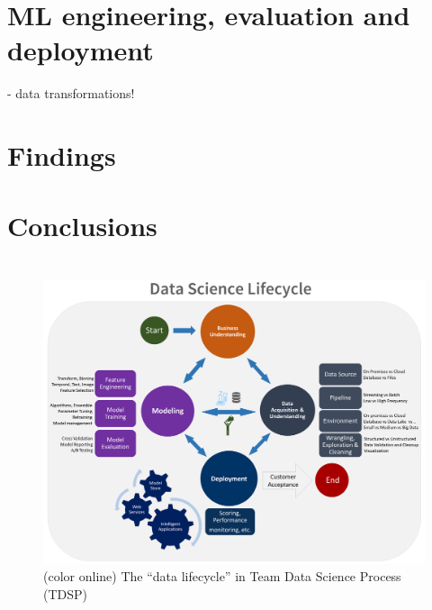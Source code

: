 \documentclass[12pt,letterpaper]{article}
\begin{document}
\section{ML engineering, evaluation and deployment}
\tab 
- data transformations!

\section{Findings}
\tab 

\section{Conclusions}
\tab 


\pagebreak
\section*{}


\begin{figure}[h!]
  \centering
    \includegraphics[width=1.0\linewidth]{../img/TDSP_Data_Science_Lifecycle.png}
    \caption{(color online) The ``data lifecycle'' in Team Data Science Process (TDSP)}
    \label{fig:tdsp}
  \end{figure}


\clearpage
\section*{}

\center{}
\end{document}
